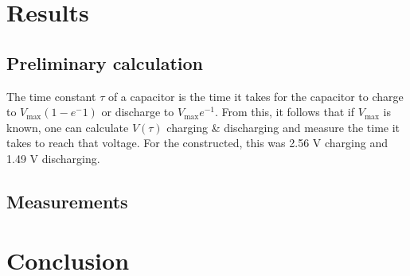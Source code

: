 \documentclass{article}
\begin{document}
\section{Results}
    \subsection{Preliminary calculation}
        The time constant $\tau$ of a capacitor is the time it takes for the capacitor to charge to $V_\mathrm{max}(1-e^-1)$ or discharge to $V_\mathrm{max}e^{-1}$. From this, it follows that if $V_\mathrm{max}$ is known, one can calculate $V(\tau)$ charging \& discharging and measure the time it takes to reach that voltage.
        For the constructed, this was 2.56 V charging and 1.49 V discharging.
    \subsection{Measurements}
    
    \begin{table}[h]
        \centering
    \end{table}

\section{Conclusion}
\end{document}
